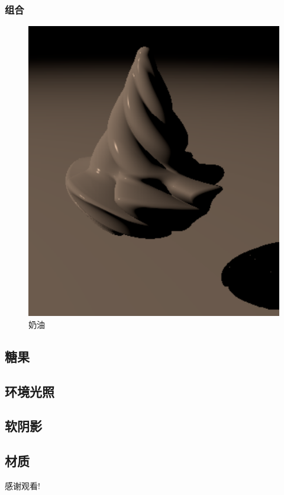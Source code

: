 \documentclass[aspectratio=169]{ctexbeamer} %
\begin{document}
\begin{frame}
    \frametitle{组合}
    \begin{figure}[htbp]
        \centering
        \includegraphics[height=.75\textheight]{images/pre/head/cream.pdf}
        \caption{奶油}
        \label{fig:cream}
    \end{figure}
\end{frame}
\subsection{糖果}
\subsection{环境光照}
\subsection{软阴影}
\subsection{材质}

\begin{frame}
    \begin{center}
        \Huge{感谢观看!}
    \end{center}
\end{frame}
\end{document}
